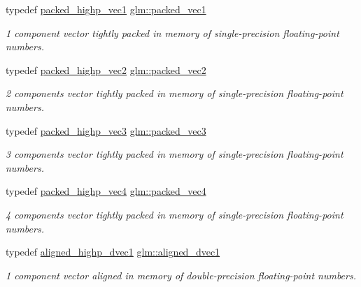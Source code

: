 \begin{DoxyCompactItemize}
typedef \mbox{\hyperlink{group__gtc__type__aligned_ga0356e10a8b10f699cf7cf4308f449c83}{packed\+\_\+highp\+\_\+vec1}} \mbox{\hyperlink{group__gtc__type__aligned_ga1722068e0357aca709e5002f20cc043f}{glm\+::packed\+\_\+vec1}}
\begin{DoxyCompactList}\small\item\em 1 component vector tightly packed in memory of single-\/precision floating-\/point numbers. \end{DoxyCompactList}\item 
typedef \mbox{\hyperlink{group__gtc__type__aligned_ga15068ebf3dae2c205d90b1d36780bf9b}{packed\+\_\+highp\+\_\+vec2}} \mbox{\hyperlink{group__gtc__type__aligned_ga702841b8b37825c9a51d95bc0f7848b2}{glm\+::packed\+\_\+vec2}}
\begin{DoxyCompactList}\small\item\em 2 components vector tightly packed in memory of single-\/precision floating-\/point numbers. \end{DoxyCompactList}\item 
typedef \mbox{\hyperlink{group__gtc__type__aligned_ga6814dd861e658e724ce9e5e673a4486b}{packed\+\_\+highp\+\_\+vec3}} \mbox{\hyperlink{group__gtc__type__aligned_ga8e23eba0ebe21b912cd783f69fa3a99b}{glm\+::packed\+\_\+vec3}}
\begin{DoxyCompactList}\small\item\em 3 components vector tightly packed in memory of single-\/precision floating-\/point numbers. \end{DoxyCompactList}\item 
typedef \mbox{\hyperlink{group__gtc__type__aligned_gabbc42b2b5ad854c60821526c4e291161}{packed\+\_\+highp\+\_\+vec4}} \mbox{\hyperlink{group__gtc__type__aligned_gacb6d3e09d6aa52d954934e570b5c4fb1}{glm\+::packed\+\_\+vec4}}
\begin{DoxyCompactList}\small\item\em 4 components vector tightly packed in memory of single-\/precision floating-\/point numbers. \end{DoxyCompactList}\item 
typedef \mbox{\hyperlink{group__gtc__type__aligned_ga85671dcb7eef983b5035273fe78dd963}{aligned\+\_\+highp\+\_\+dvec1}} \mbox{\hyperlink{group__gtc__type__aligned_ga81fe4410dc880770293c53fcba83c9e4}{glm\+::aligned\+\_\+dvec1}}
\begin{DoxyCompactList}\small\item\em 1 component vector aligned in memory of double-\/precision floating-\/point numbers. \end{DoxyCompactList}\item 

\end{DoxyCompactItemize}
